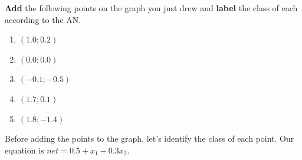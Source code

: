 \item[\textbf{Problem 3}]
\textbf{Add} the following points on the graph you just drew and \textbf{label}
the class of each according to the AN.
\begin{enumerate}
    \item $(1.0; 0.2)$
    \item $(0.0; 0.0)$
    \item $(-0.1; -0.5)$
    \item $(1.7; 0.1)$
    \item $(1.8; -1.4)$
\end{enumerate}

\Solution

Before adding the points to the graph, let's identify the class of each point.
Our equation is $net = 0.5 + x_{1} - 0.3x_{2}$.

